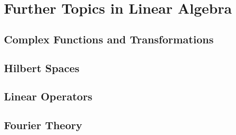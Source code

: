 \documentclass[12pt,letterpaper, openany]{book} %
\begin{document}
 
\frontmatter



%
 
\clearpage
\thispagestyle{empty}
 
\tableofcontents
 
\mainmatter

\setcounter{part}{4}
\part{Further Topics in Linear Algebra}

\chapter{Complex Functions and Transformations}
 

\chapter{Hilbert Spaces}


\chapter{Linear Operators}


\chapter{Fourier Theory}

\end{document}
